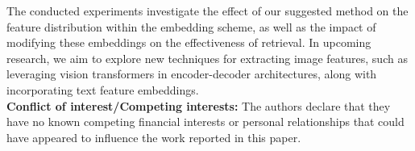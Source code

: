 \documentclass[10pt,lineno]{wlpeerj}
\begin{document}
The conducted experiments investigate the effect of our suggested method on the feature distribution within the embedding scheme, as well as the impact of modifying these embeddings on the effectiveness of retrieval. In upcoming research, we aim to explore new techniques for extracting image features, such as leveraging vision transformers in encoder-decoder architectures, along with incorporating text feature embeddings. \\

\textbf{Conflict of interest/Competing interests:} The authors declare that they have no known competing financial interests or personal relationships that could have appeared to influence the work reported in this paper.

%  

\end{document}
